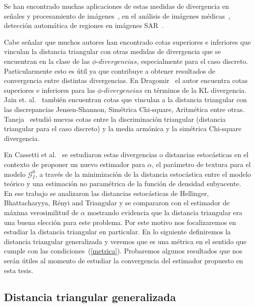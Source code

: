 Se han encontrado muchas aplicaciones de estas medidas de divergencia en señales y procesamiento de imágenes~\cite{4218961}, en el análisis de imágenes médicas~\cite{5599869}, detección automática de regiones en imágenes SAR~\cite{ClassificationPolSARSegmentsMinimizationWishartDistances,EdgeDetectionDistancesEntropiesJSTARS,SARSegmentationLevelSetGA0}. 

Cabe señalar que muchos autores han encontrado cotas superiores e inferiores que vinculan la distancia triangular con otras medidas de divergencia que se encuentran en la clase de las $\phi \text{-} divergencias$, especialmente para el caso discreto. Particularmente esto es útil ya que contribuye a obtener resultados de convergencia entre distintas divergencias. En Dragomir~\cite{Dragomir2002} el autor encuentra cotas superiores e inferiores para las $\phi \text{-} divergencias$ en términos de la KL divergencia. Jain et. al.~\cite{JainSrivastava2007} también encuentran cotas que vinculan a la distancia triangular con las discrepancias Jensen-Shannon, Simétrica Chi-square, Aritmética entre otras. 
Taneja~\cite{Taneja2006} estudió nuevas cotas entre la discriminación triangular (distancia triangular para el caso discreto) y la media armónica y la simétrica Chi-square divergencia.

En Cassetti et al.~\cite{APSAR2013ParameterEstimationStochasticDistances} se estudiaron estas divergencias o distancias estocásticas en el contexto de proponer un nuevo estimador para $\alpha$, el parámetro de textura para el modelo $\mathcal{G}_I^0$, a través de la minimización de la distancia estocástica entre el modelo teórico y una estimación no paramétrica de la función de densidad subyacente. En ese trabajo se analizaron las distancias estocásticas de Hellinger, Bhattacharyya, R\'enyi and Triangular y se compararon con el estimador de máxima verosimilitud de $\alpha$ mostrando evidencia que la distancia triangular era una buena elección para este problema. Por este motivo nos focalizaremos en estudiar la distancia triangular en particular. En lo siguiente definiremos la distancia triangular generalizada y veremos que es una métrica en el sentido que cumple con las condiciones~(\ref{metrica}). Probaremos algunos resultados que nos serán útiles al momento de estudiar la convergencia del estimador propuesto en esta tesis.

\subsection{Distancia triangular generalizada}

